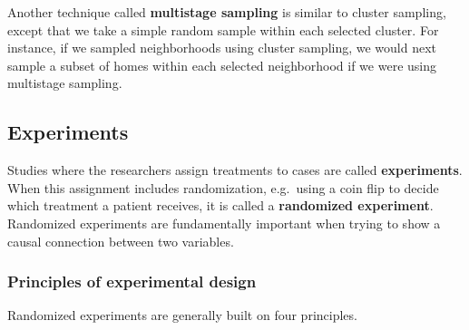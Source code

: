 \documentclass[
  letterpaper,
  DIV=11,
  numbers=noendperiod]{scrreprt}
\begin{document}
Another technique called \textbf{multistage sampling} is similar to
cluster sampling, except that we take a simple random sample within each
selected cluster. For instance, if we sampled neighborhoods using
cluster sampling, we would next sample a subset of homes within each
selected neighborhood if we were using multistage sampling.

\subsection{Experiments}\label{experiments}

Studies where the researchers assign treatments to cases are called
\textbf{experiments}. When this assignment includes randomization,
e.g.~using a coin flip to decide which treatment a patient receives, it
is called a \textbf{randomized experiment}. Randomized experiments are
fundamentally important when trying to show a causal connection between
two variables.

\subsubsection{Principles of experimental
design}\label{principles-of-experimental-design}

Randomized experiments are generally built on four principles.
\end{document}
